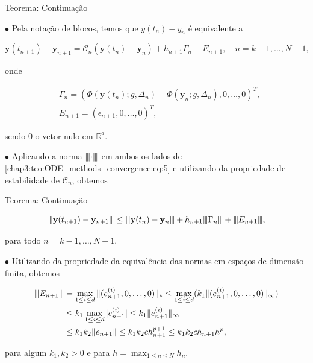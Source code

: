 \documentclass{beamer}
\newcommand{\vertiii}[1]{{\left\vert\kern-0.25ex\left\vert\kern-0.25ex\left\vert #1 
    \right\vert\kern-0.25ex\right\vert\kern-0.25ex\right\vert}}
\theoremstyle{plain}
\theoremstyle{definition}
\begin{document}
\begin{frame}{Teorema: Continuação}

    \small

    \phantom{aa} $\bullet$ Pela notação de blocos, temos que $y(t_n) - y_n$ é equivalente a 

    \begin{equation}
      \mathbf{y}\left(t_{n+1}\right)-\mathbf{y}_{n+1}=\mathcal{C}_{n}\left(\mathbf{y}\left(t_{n}\right)-\mathbf{y}_{n}\right)+h_{n+1} \Gamma_{n}+E_{n+1}, \quad n=k-1, \ldots, N-1 
      \label{chap3:teo:ODE_methods_convergence:eq:5}, 
    \end{equation}
  
    \noindent
    onde

    \begin{align*}
      &\Gamma_{n}=\left(\Phi\left(\mathbf{y}\left(t_{n}\right) ; g, \Delta_{n}\right)-\Phi\left(\mathbf{y}_{n} ; g, \Delta_{n}\right), 0, \ldots, 0\right)^{T}, \\
      &E_{n+1}=\left(\epsilon_{n+1}, 0, \ldots, 0\right)^{T},
    \end{align*}

    \noindent
    sendo 0 o vetor nulo em \(\mathbb{R}^{d}\). 

    \phantom{aa} $\bullet$ Aplicando a norma $\vertiii{\cdot}$ em ambos os lados de \eqref{chap3:teo:ODE_methods_convergence:eq:5} e utilizando da propriedade de estabilidade de $\mathcal{C}_n$, obtemos

\end{frame}



\begin{frame}{Teorema: Continuação}

    \small

    \[
      \vertiii{\mathbf{y}(t_{n+1})-\mathbf{y}_{n+1}} \leq \vertiii{\mathbf{y}(t_{n})-\mathbf{y}_{n}}+h_{n+1} \vertiii{\Gamma _ { n }} + \vertiii{E_{n+1} },
    \]

    \noindent
    para todo \(n=k-1, \ldots, N-1\).

    \phantom{aa} $\bullet$ Utilizando da propriedade da equivalência das normas em espaços de dimensão finita, obtemos 

    \[
      \begin{aligned}
        \vertiii{E_{n+1}} &= \max_{1 \leq i \leq d} \| (e_{n+1}^{(i)}, 0, \dots, 0) \|_* \leq 
        \max_{1 \leq i \leq d} ( k_1 \| (e_{n+1}^{(i)}, 0, \dots, 0) \|_\infty ) \\
                          &\leq k_1 \max_{1 \leq i \leq d} |e_{n+1}^{(i)}| 
        \leq k_1 \|e_{n+1}^{(i)}\|_\infty  \\
                          &\leq k_1 k_2 \|e_{n+1}\| \leq k_1 k_2 c h_{n+1}^{p+1} \leq k_1 k_2 c h_{n+1} h^{p},
      \end{aligned}
    \]

    \noindent
    para algum $k_1, k_2 > 0$ e para $h = \max_{1 \leq n \leq N} h_n$.
\end{frame}
\end{document}
